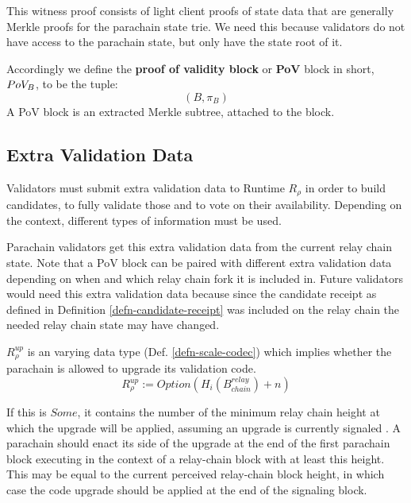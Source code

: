 This witness proof consists of light client proofs of state data that are
generally Merkle proofs for the parachain state trie.  We need this because
validators do not have access to the parachain state, but only have the state
root of it.

\begin{definition}
  \label{defn-pov-block}
  Accordingly we define the {\bf proof of validity block} or {\bf PoV} block in
  short, {\bf $PoV_B$}, to be the tuple:
  \[
  (B, \pi_B)
  \]
  A PoV block is an extracted Merkle subtree, attached to the block.
\end{definition}

\subsection{Extra Validation Data}

Validators must submit extra validation data to Runtime $R_{\rho}$ in order to
build candidates, to fully validate those and to vote on their availability.
Depending on the context, different types of information must be used.
\newline

Parachain validators get this extra validation data from the current relay
chain state. Note that a PoV block can be paired with different extra
validation data depending on when and which relay chain fork it is included
in. Future validators would need this extra validation data because since the
candidate receipt as defined in Definition \ref{defn-candidate-receipt} was
included on the relay chain the needed relay chain state may have changed.

\begin{definition}
  \label{defn-upgrade-indicator}
  $R^{up}_{\rho}$ is an varying data type (Def. \ref{defn-scale-codec}) which
  implies whether the parachain is allowed to upgrade its validation code.
  \[
    R^{up}_{\rho} := Option(H_i(B^{relay}_{chain})+n)
  \]


  If this is $Some$, it contains the number of the minimum relay chain height
  at which the upgrade will be applied, assuming an upgrade is currently
  signaled . A parachain should enact its
  side of the upgrade at the end of the first parachain block executing in the
  context of a relay-chain block with at least this height. This may be equal to
  the current perceived relay-chain block height, in which case the code upgrade
  should be applied at the end of the signaling block.
\end{definition}

